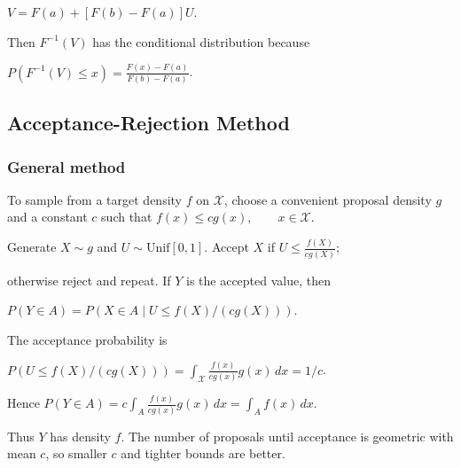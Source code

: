 $V=F(a)+[F(b)-F(a)]U$.

Then $F^{-1}(V)$ has the conditional distribution because

$P(F^{-1}(V)\le x)=\frac{F(x)-F(a)}{F(b)-F(a)}$.

\subsection{Acceptance-Rejection Method}

\subsubsection*{General method}

To sample from a target density $f$ on $\mathcal{X}$, choose a convenient proposal density $g$ and a constant $c$ such that
$f(x)\le c g(x),\qquad x\in\mathcal{X}$.

Generate $X\sim g$ and $U\sim\mathrm{Unif}[0,1]$. Accept $X$ if
$U\le\frac{f(X)}{c g(X)}$;

otherwise reject and repeat. If $Y$ is the accepted value, then

$P(Y\in A)=P(X\in A\mid U\le f(X)/(cg(X)))$.

The acceptance probability is

$P(U\le f(X)/(cg(X)))=\int_{\mathcal{X}}\frac{f(x)}{cg(x)}g(x)\,dx=1/c$.

Hence
$P(Y\in A)=c\int_A\frac{f(x)}{cg(x)}g(x)\,dx=\int_A f(x)\,dx$.

Thus $Y$ has density $f$. The number of proposals until acceptance is geometric with mean $c$, so smaller $c$ and tighter bounds are better.









